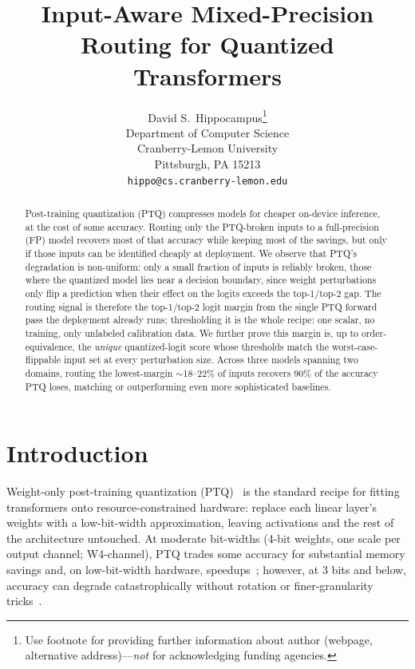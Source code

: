\documentclass{article}
\title{Input-Aware Mixed-Precision Routing for Quantized Transformers}
\author{%
  David S.~Hippocampus\thanks{Use footnote for providing further information
    about author (webpage, alternative address)---\emph{not} for acknowledging
    funding agencies.} \\
  Department of Computer Science\\
  Cranberry-Lemon University\\
  Pittsburgh, PA 15213 \\
  \texttt{hippo@cs.cranberry-lemon.edu} \\
}
\newcommand{\fp}{\textsc{FP}\xspace}
\newcommand{\ptq}{\textsc{PTQ}\xspace}
\begin{document}
\maketitle


\begin{abstract}
  Post-training quantization (\ptq) compresses models for cheaper on-device inference, at the cost of some accuracy. Routing only the \ptq-broken inputs to a full-precision (\fp) model recovers most of that accuracy while keeping most of the savings, but only if those inputs can be identified cheaply at deployment. We observe that \ptq's degradation is non-uniform: only a small fraction of inputs is reliably broken, those where the quantized model lies near a decision boundary, since weight perturbations only flip a prediction when their effect on the logits exceeds the top-1/top-2 gap. The routing signal is therefore the top-1/top-2 logit margin from the single \ptq{} forward pass the deployment already runs; thresholding it is the whole recipe: one scalar, no training, only unlabeled calibration data. We further prove this margin is, up to order-equivalence, the \emph{unique} quantized-logit score whose thresholds match the worst-case-flippable input set at every perturbation size. Across three models spanning two domains, routing the lowest-margin $\sim$18--22\% of inputs recovers 90\% of the accuracy \ptq{} loses, matching or outperforming even more sophisticated baselines.
\end{abstract}

\section{Introduction}
\label{sec:intro}

Weight-only post-training quantization (\ptq)~\cite{gholami2022survey} is the standard recipe for fitting transformers onto resource-constrained hardware: replace each linear layer's weights with a low-bit-width approximation, leaving activations and the rest of the architecture untouched.
At moderate bit-widths (4-bit weights, one scale per output channel; W4-channel), \ptq trades some accuracy for substantial memory savings and, on low-bit-width hardware, speedups~\cite{frantar2023gptq,lin2024awq,jacob2018quantization,gholami2022survey}; however, at 3 bits and below, accuracy can degrade catastrophically without rotation or finer-granularity tricks~\cite{ashkboos2024quarot,liu2024spinquant}.
\end{document}
